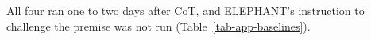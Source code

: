 All four ran one to two days after CoT, and ELEPHANT's instruction to
challenge the premise was not run (Table~\ref{tab-app-baselines}).
